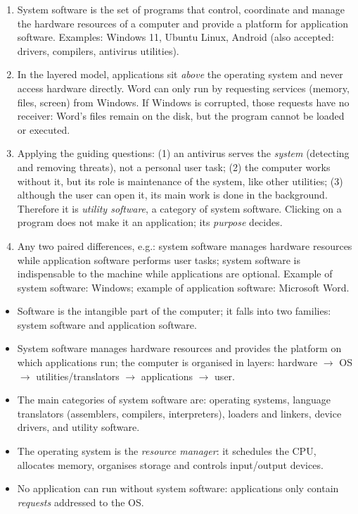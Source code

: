 \documentclass[11pt]{article}
\newcommand{\cle}[1]{{\popxbold\color{popdark}#1}}
\begin{document}
\begin{corrige}[Exercise 1]
\begin{enumerate}
\item System software is the set of programs that control, coordinate and manage the hardware resources of a computer and provide a platform for application software. Examples: Windows 11, Ubuntu Linux, Android (also accepted: drivers, compilers, antivirus utilities).
\item In the layered model, applications sit \emph{above} the operating system and never access hardware directly. Word can only run by requesting services (memory, files, screen) from Windows. If Windows is corrupted, those requests have no receiver: Word's files remain on the disk, but the program cannot be loaded or executed.
\item Applying the guiding questions: (1) an antivirus serves the \emph{system} (detecting and removing threats), not a personal user task; (2) the computer works without it, but its role is maintenance of the system, like other utilities; (3) although the user can open it, its main work is done in the background. Therefore it is \emph{utility software}, a category of system software. Clicking on a program does not make it an application; its \emph{purpose} decides.
\item Any two paired differences, e.g.: system software manages hardware resources while application software performs user tasks; system software is indispensable to the machine while applications are optional. Example of system software: Windows; example of application software: Microsoft Word.
\end{enumerate}
\end{corrige}

\begin{aretenir}
\begin{itemize}
\item Software is the intangible part of the computer; it falls into two families: \cle{system software} and \cle{application software}.
\item System software manages hardware resources and provides the platform on which applications run; the computer is organised in layers: hardware $\rightarrow$ OS $\rightarrow$ utilities/translators $\rightarrow$ applications $\rightarrow$ user.
\item The main categories of system software are: operating systems, language translators (assemblers, compilers, interpreters), loaders and linkers, device drivers, and utility software.
\item The operating system is the \emph{resource manager}: it schedules the CPU, allocates memory, organises storage and controls input/output devices.
\item No application can run without system software: applications only contain \emph{requests} addressed to the OS.
\end{itemize}
\end{aretenir}
\end{document}
